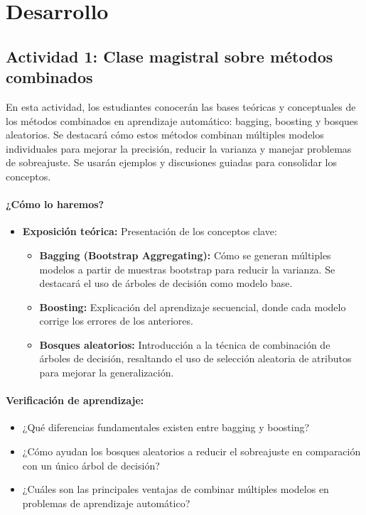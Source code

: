 \documentclass[a4,11pt]{aleph-notas}
\begin{document}
\section*{Desarrollo}

\subsection*{Actividad 1: Clase magistral sobre métodos combinados}  


En esta actividad, los estudiantes conocerán las bases teóricas y conceptuales de los métodos combinados en aprendizaje automático: bagging, boosting y bosques aleatorios. Se destacará cómo estos métodos combinan múltiples modelos individuales para mejorar la precisión, reducir la varianza y manejar problemas de sobreajuste. Se usarán ejemplos y discusiones guiadas para consolidar los conceptos.

\paragraph{¿Cómo lo haremos?}  
\begin{itemize}[leftmargin=*]  
    \item \textbf{Exposición teórica: }
    Presentación de los conceptos clave:
    \begin{itemize}  
        \item \textbf{Bagging (Bootstrap Aggregating):} Cómo se generan múltiples modelos a partir de muestras bootstrap para reducir la varianza. Se destacará el uso de árboles de decisión como modelo base.
        \item \textbf{Boosting:} Explicación del aprendizaje secuencial, donde cada modelo corrige los errores de los anteriores.
        \item \textbf{Bosques aleatorios:} Introducción a la técnica de combinación de árboles de decisión, resaltando el uso de selección aleatoria de atributos para mejorar la generalización.
    \end{itemize}  

\end{itemize}  

\paragraph{Verificación de aprendizaje:}  
\begin{itemize}[leftmargin=*]  
    \item ¿Qué diferencias fundamentales existen entre bagging y boosting?  
    \item ¿Cómo ayudan los bosques aleatorios a reducir el sobreajuste en comparación con un único árbol de decisión?  
    \item ¿Cuáles son las principales ventajas de combinar múltiples modelos en problemas de aprendizaje automático?  
\end{itemize}  
\end{document}
